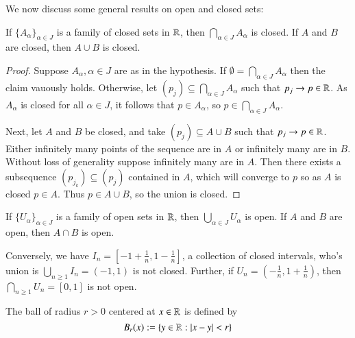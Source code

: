 We now discuss some general results on open and closed sets: 

\begin{prop}
    If $\{A_{\alpha}\}_{\alpha \in J}$ is a family of closed sets in $\mathbb R$, then $\bigcap_{\alpha\in J}A_{\alpha}$ is closed. If $A$ and $B$ are closed, then $A \cup B$ is closed.
\end{prop}
\begin{proof}
    Suppose $A_{\alpha},\alpha \in J$ are as in the hypothesis. If $\emptyset = \bigcap_{\alpha \in J}A_{\alpha}$ then the claim vauously holds. Otherwise, let $(p_j) \subseteq \bigcap_{\alpha \in J}A_{\alpha}$ such that $p_j \rightarrow p \in \mathbb R$. As $A_{\alpha}$ is closed for all $\alpha \in J$, it follows that $p \in A_{\alpha}$, so $p \in \bigcap_{\alpha \in J}A_{\alpha}$. 

    Next, let $A$ and $B$ be closed, and take $(p_j) \subseteq A\cup B$ such that $p_j\rightarrow p \in \mathbb R$. Either infinitely many points of the sequence are in $A$ or infinitely many are in $B$. Without loss of generality suppose infinitely many are in $A$. Then there exists a subsequence $(p_{j_k}) \subseteq (p_j)$ contained in $A$, which will converge to $p$ so as $A$ is closed $p \in A$. Thus $p \in A \cup B$, so the union is closed.
\end{proof}

\begin{cor}
    If $\{U_{\alpha}\}_{\alpha \in J}$ is a family of open sets in $\mathbb R$, then $\bigcup_{\alpha\in J}U_{\alpha}$ is open. If $A$ and $B$ are open, then $A \cap B$ is open.
\end{cor}

Conversely, we have $I_n = [-1+\frac{1}{n},1-\frac{1}{n}]$, a collection of closed intervals, who's union is $\bigcup_{n\geq 1}I_n = (-1,1)$ is not closed. Further, if $U_n = (-\frac{1}{n},1+\frac{1}{n})$, then $\bigcap_{n\geq 1}U_n = [0,1]$ is not open.

\begin{defn}
    The ball of radius $r > 0$ centered at $x \in \mathbb R$ is defined by $$B_r(x) := \{y \in \mathbb R:|x-y| < r\}$$ 
\end{defn}

